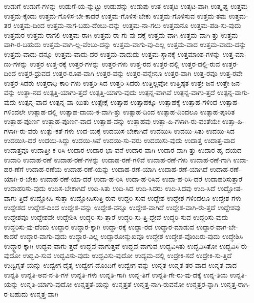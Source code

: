 {ಉಡುಗೆ
ಉಡುಗೆ-ಗಳನ್ನು
ಉಡುಗೆ-ಯ-ನ್ನುಟ್ಟು
ಉಡುಪನ್ನು
ಉಡುಪು
ಉತ
ಉತ್ಕಟ
ಉತ್ಕಟ-ವಾಗಿ
ಉತ್ಕೃಷ್ಟ
ಉತ್ತಮ
ಉತ್ತಮ-ಕ್ಕೆಂದು
ಉತ್ತಮ-ಗೊಳಿಸ-ಬೇ-ಕಾದರೆ
ಉತ್ತಮ-ಗೊಳಿಸ-ಬೇಕು
ಉತ್ತಮ-ಗೊಳಿಸುವ
ಉತ್ತಮ-ತಮ
ಉತ್ತಮ-ತರ
ಉತ್ತಮ-ದಿಂದ
ಉತ್ತಮ-ನಾಗ-ಬಹು-ದೆಂಬು-ದನ್ನು
ಉತ್ತಮ-ನಾ-ಗಲು
ಉತ್ತಮನೂ
ಉತ್ತಮ-ಪಡಿ-ಸು-ವುದು
ಉತ್ತಮರ
ಉತ್ತಮ-ರಾಗಲಿ
ಉತ್ತಮ-ರಾಗಿ
ಉತ್ತಮ-ರಾ-ಗು-ವು-ದಕ್ಕೆ
ಉತ್ತಮ-ವಾಗಿ
ಉತ್ತಮ-ವಾಗಿ-ತ್ತು
ಉತ್ತಮ-ವಾಗಿ-ರ-ಬಹುದು
ಉತ್ತಮ-ವಾಗಿ-ಲ್ಲ-ವೆಂಬು-ದನ್ನು
ಉತ್ತಮ-ವಾಗು-ವು-ದಿಲ್ಲ
ಉತ್ತಮ-ವಾದ
ಉತ್ತಮ-ವಾದು-ದನ್ನು
ಉತ್ತಮ-ವಾದು-ದನ್ನೂ
ಉತ್ತಮ-ವಾದು-ದರ
ಉತ್ತಮ-ವಾದುದು
ಉತ್ತಮ-ಸ್ಥಾನಕ್ಕೆ
ಉತ್ತಮಾಂಶ-ಗಳನ್ನು
ಉತ್ತ-ಮಾ-ಣು-ಗಳನ್ನು
ಉತ್ತರ
ಉತ್ತ-ರಕ್ಕೆ
ಉತ್ತರ-ಗಳನ್ನು
ಉತ್ತರ-ಗಳು
ಉತ್ತ-ರದ
ಉತ್ತರ-ದಲ್ಲಿ
ಉತ್ತರ-ದಲ್ಲಿ-ರುವ
ಉತ್ತರ-ದಿಂದ
ಉತ್ತರ-ಧ್ರುವದ
ಉತ್ತರ-ರೂಪ-ವಾಗಿ
ಉತ್ತರ-ವನ್ನು
ಉತ್ತರ-ವನ್ನೇನೂ
ಉತ್ತರ-ವಾಗಿ
ಉತ್ತ-ರವೂ
ಉತ್ತ-ರವೇ
ಉತ್ತರ-ಸಿದರು
ಉತ್ತರಾಧಿ-ಕಾರಿ-ಗಳು
ಉತ್ತರಿ-ಸಿದ
ಉತ್ತರಿ-ಸಿದರು
ಉತ್ತಿಲ್ಲವೋ
ಉತ್ತಿಷ್ಠತ
ಉತ್ತೇ-ಜನ
ಉತ್ತೇ-ಜನ-ವನ್ನು
ಉತ್ಥಾ-ನದ
ಉತ್ಪತ್ತಿ-ಯಾಗು-ತ್ತದೆ
ಉತ್ಪತ್ತಿ-ಯಾಗು-ವುದು
ಉತ್ಪನ್ನ-ವಾಗಿವೆ
ಉತ್ಪನ್ನ-ವಾಗು-ತ್ತದೆ
ಉತ್ಪನ್ನ-ವಾಗು-ವುದು
ಉತ್ಪನ್ನ-ವಾದ
ಉತ್ಪನ್ನ-ವಾ-ಯಿತು
ಉತ್ಪ್ರೇಕ್ಷೆ
ಉತ್ಸಾಹ
ಉತ್ಸಾಹಕ್ಕೂ
ಉತ್ಸಾಹಕ್ಕೆ
ಉತ್ಸಾಹ-ಗಳಿಂದ
ಉತ್ಸಾಹ-ಗಳಿಂದಲೇ
ಉತ್ಸಾಹ-ದಲ್ಲಿ
ಉತ್ಸಾಹ-ದಾಯ-ಕ-ವಾಗಿ-ತ್ತು
ಉತ್ಸಾಹ-ದಿಂದ
ಉತ್ಸಾಹ-ದಿಂದಲೂ
ಉತ್ಸಾಹ-ಪೂರಿತ
ಉತ್ಸಾಹ-ಪೂರ್ಣ
ಉತ್ಸಾಹ-ಪೂರ್ಣ-ವಾದ
ಉತ್ಸಾಹ-ವನ್ನು
ಉತ್ಸಾಹವು
ಉತ್ಸಾ-ಹಿ-ಗಳಾಗಿ-ರು-ವಂತೆಯೇ
ಉತ್ಸಾ-ಹಿ-ಗಳಾಗಿ-ರು-ವರು
ಉತ್ಸು-ಕತೆ-ಗಳು
ಉದ-ಯಕ್ಕೆ
ಉದಯಿಸ-ಬೇಕಾಗಿದೆ
ಉದಯಿಸಿ
ಉದಯಿ-ಸಿತು
ಉದಯಿ-ಸಿದ
ಉದಯಿಸಿ-ದರೆ
ಉದಯಿ-ಸಿದ್ದು
ಉದಯಿ-ಸಿವೆ
ಉದಯಿ-ಸು-ವರು
ಉದಯಿಸು-ವುದು
ಉದಾತ್ತ
ಉದಾತ್ತ-ವಾದ
ಉದಾತ್ತವೂ
ಉದಾತ್ತೀ-ಕ-ರಿಸಿ
ಉದಾರ
ಉದಾರ-ಭಾ-ವನೆ
ಉದಾರ-ವಾಗಿ
ಉದಾರ-ವಾಗಿ-ತ್ತು
ಉದಾರ-ಹೃ-ದಯದ
ಉದಾರಿ
ಉದಾಹ-ರಣೆ
ಉದಾಹ-ರಣೆ-ಗಳನ್ನು
ಉದಾಹ-ರಣೆ-ಗಳಿವೆ
ಉದಾಹ-ರಣೆ-ಗಳು
ಉದಾಹ-ರಣೆ-ಗಾಗಿ
ಉದಾ-ಹರ-ಣೆಗೆ
ಉದಾಹ-ರಣೆಯ
ಉದಾಹ-ರಣೆ-ಯನ್ನು
ಉದಾಹ-ರಣೆ-ಯಾಗಿ
ಉದಾಹ-ರಣೆ-ಯಾಗಿದೆ
ಉದಾಹ-ರಣೆ-ಯಾಗಿ-ರ-ಬೇಕು
ಉದಾಹ-ರಣೆ-ಯಾ-ದರೆ
ಉದಾ-ಹ-ರಿಸಿ
ಉದಾ-ಹ-ರಿಸಿದ
ಉದಾ-ಹ-ರಿಸಿ-ದರೆ
ಉದಾಹರಿಸುತ್ತಾರೆ
ಉದಾಹರಿಸು-ವುದು
ಉದಿಸ-ಬೇಕಾಗಿದೆ
ಉದಿ-ಸಿತು
ಉದಿ-ಸಿದ
ಉದಿ-ಸಿದರು
ಉದಿ-ಸಿದವು
ಉದಿ-ಸಿದೆ
ಉದ್ಘೋಷ-ವಾಗು-ತ್ತಿದೆ
ಉದ್ಘೋಷಿ-ಸುತ್ತಾ
ಉದ್ಘೋಷಿಸುತ್ತಿ-ರುವ
ಉದ್ದರಿ-ಸುವ
ಉದ್ದೇಶ
ಉದ್ದೇಶ-ಗಳಿಂದಲೂ
ಉದ್ದೇಶ-ಗಳು
ಉದ್ದೇಶದ
ಉದ್ದೇಶ-ದಿಂದ
ಉದ್ದೇಶ-ವನ್ನು
ಉದ್ದೇಶ-ವನ್ನೂ
ಉದ್ದೇಶ-ವಾಗಿದೆ
ಉದ್ದೇಶ-ವಾಗಿ-ರು-ತ್ತದೆ
ಉದ್ದೇಶವು
ಉದ್ದೇಶವೂ
ಉದ್ದೇಶವೇ
ಉದ್ದೇಶಿಸಿ
ಉದ್ಧರಿ-ಸು-ತ್ತಾರೆ
ಉದ್ಧರಿ-ಸು-ತ್ತಿ-ದ್ದೇವೆ
ಉದ್ಧರಿ-ಸುವ
ಉದ್ಧರಿಸು-ವುದು
ಉದ್ಧರಿಸು-ವು-ದೆಂದು
ಉದ್ಧಾರ
ಉದ್ಧಾರ-ಕ್ಕಾಗಿ
ಉದ್ಧಾ-ರಕ್ಕೆ
ಉದ್ಧಾ-ರದ
ಉದ್ಧಾರ-ಮಾಡುವ
ಉದ್ಧಾರ-ವಾಗ-ಬೇ-ಕಾದರೆ
ಉದ್ಧಾರ-ವಾಗು-ವುದು
ಉದ್ಧಾರ-ವಿಲ್ಲ
ಉದ್ಧಾರೋನ್ಮುಖವೂ
ಉದ್ಧೇಶ
ಉದ್ಧೇಶ-ವೊಂದಿರು-ವುದು
ಉದ್ಧೇಶಿಸಿ
ಉದ್ಧ್ದಾರ-ಕ್ಕಾಗಿ
ಉದ್ಭವ-ವಾಗು-ತ್ತದೆ
ಉದ್ಭವ-ವಾಗುತ್ತವೆ
ಉದ್ಭವ-ವಾಗುವ
ಉದ್ಭವಿಸಿತು
ಉದ್ಭವಿಸಿತೋ
ಉದ್ಭವಿಸಿ-ರು-ವುದೋ
ಉದ್ಭವಿ-ಸುವ
ಉದ್ಭವಿಸು-ವುದು
ಉದ್ಭವಿಸು-ವುದೋ
ಉದ್ಯಮ-ದಲ್ಲಿ
ಉದ್ರೇಕಿ-ಸದೆ
ಉದ್ರೇಕಿ-ಸು-ತ್ತಿದೆ
ಉದ್ವಿಗ್ನತೆ-ಯನ್ನು
ಉದ್ವೇಗ-ದೈತ್ಯ
ಉದ್ವೇಗ-ದೊಂದಿಗೆ
ಉದ್ವೇಗ-ವನ್ನು
ಉನ್ನತ
ಉನ್ನತ-ತರ-ವಾದ
ಉನ್ನತ-ವಾದ
ಉನ್ನತಿ
ಉನ್ನತಿ-ಅವ-ನ-ತಿ-ಗಳ
ಉನ್ನತಿ-ಗಳು
ಉನ್ನತಿ-ಗಾಗಿ
ಉನ್ನ-ತಿಗೆ
ಉನ್ನತಿ-ಗೇ-ರು-ವು-ದಕ್ಕೆ
ಉನ್ನ-ತಿಯ
ಉನ್ನತಿ-ಯನ್ನು
ಉನ್ನತಿ-ಯಾಗು-ವುದೋ
ಉನ್ನತ್ತತೆ-ಯನ್ನು
ಉನ್ಮತ್ತತೆ
ಉನ್ಮತ್ತ-ನಾಗಿ-ರುವನೋ
ಉನ್ಮತ್ತರ-ನ್ನಾಗಿ
ಉನ್ಮತ್ತ-ರಾಗಿ-ರ-ಬಹುದು
ಉನ್ಮತ್ತ-ವಾಗಿ
}
